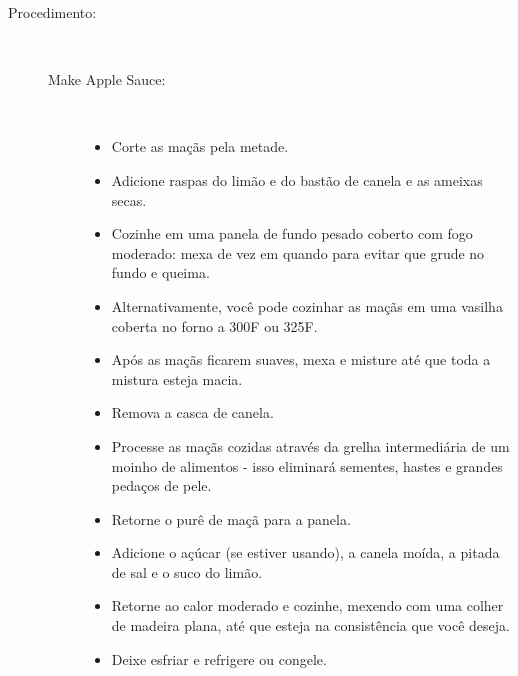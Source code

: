 \documentclass [11pt, letterpaper] {article}
\begin{document}
\begin {description}
\item [Procedimento:] \ \\
\begin {description}
\item [Make Apple Sauce:] \ \\
\begin {itemize}
\item Corte as maçãs pela metade.
\item Adicione raspas do limão e do bastão de canela e as ameixas secas.
\item Cozinhe em uma panela de fundo pesado coberto com fogo moderado: mexa de vez em quando para evitar que grude no fundo e queima.
\item Alternativamente, você pode cozinhar as maçãs em uma vasilha coberta no forno a 300F ou 325F.
\item Após as maçãs ficarem suaves, mexa e misture até que toda a mistura esteja macia.
\item Remova a casca de canela.
\item Processe as maçãs cozidas através da grelha intermediária de um moinho de alimentos - isso eliminará sementes, hastes e grandes pedaços de pele.
\item Retorne o purê de maçã para a panela.
\item Adicione o açúcar (se estiver usando), a canela moída, a pitada de sal e o suco do limão.
\item Retorne ao calor moderado e cozinhe, mexendo com uma colher de madeira plana, até que esteja na consistência que você deseja.
\item Deixe esfriar e refrigere ou congele.
\end {itemize}


\end{description}
\end{description}
\end{document}
